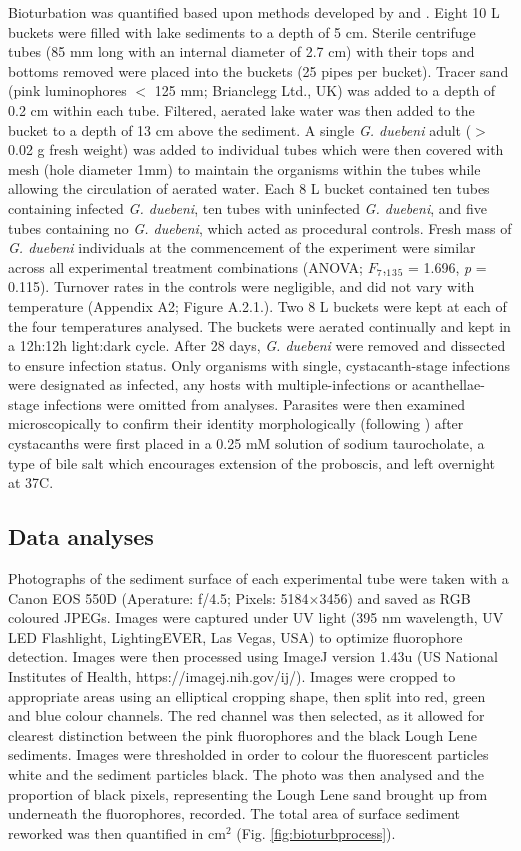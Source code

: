 Bioturbation was quantified based upon methods developed by \citet{denadai2013} and \citet{wohlgemuth2017}. Eight 10 L buckets were filled with lake sediments to a depth of 5 cm. Sterile centrifuge tubes (85 mm long with an internal diameter of 2.7 cm) with their tops and bottoms removed were placed into the buckets (25 pipes per bucket). Tracer sand (pink luminophores $<$ 125 mm; Brianclegg Ltd., UK) was added to a depth of 0.2 cm within each tube. Filtered, aerated lake water was then added to the bucket to a depth of 13 cm above the sediment. A single \emph{G. duebeni} adult ($>$ 0.02 g fresh weight) was added to individual tubes which were then covered with mesh (hole diameter 1mm) to maintain the organisms within the tubes while allowing the circulation of aerated water. Each 8 L bucket contained ten tubes containing infected \emph{G. duebeni}, ten tubes with uninfected \emph{G. duebeni}, and five tubes containing no \emph{G. duebeni}, which acted as procedural controls. Fresh mass of \emph{G. duebeni} individuals at the commencement of the experiment were similar across all experimental treatment combinations (ANOVA; $F_7$,$_1$$_3$$_5$ = 1.696,  \emph{p} = 0.115). Turnover rates in the controls were negligible, and did not vary with temperature (Appendix A2; Figure A.2.1.). Two 8 L buckets were kept at each of the four temperatures analysed. The buckets were aerated continually and kept in a 12h:12h light:dark cycle. After 28 days, \emph{G. duebeni} were removed and dissected to ensure infection status. Only organisms with single, cystacanth-stage infections were designated as infected, any hosts with multiple-infections or acanthellae-stage infections were omitted from analyses. Parasites were then examined microscopically to confirm their identity morphologically (following \citet{mcdonald1988}) after cystacanths were first placed in a 0.25 mM solution of sodium taurocholate, a type of bile salt which encourages extension of the proboscis, and left overnight at 37\degree C.

\subsection{Data analyses}

Photographs of the sediment surface of each experimental tube were taken with a Canon EOS 550D (Aperature: f/4.5; Pixels: 5184$\times$3456) and saved as RGB coloured JPEGs. Images were captured under UV light (395 nm wavelength, UV LED Flashlight, LightingEVER, Las Vegas, USA) to optimize fluorophore detection. Images were then processed using ImageJ version 1.43u (US National Institutes of Health, https://imagej.nih.gov/ij/). Images were cropped to appropriate areas using an elliptical cropping shape, then split into red, green and blue colour channels. The red channel was then selected, as it allowed for clearest distinction between the pink fluorophores and the black Lough Lene sediments.  Images were thresholded in order to colour the fluorescent particles white and the sediment particles black. The photo was then analysed and the proportion of black pixels, representing the Lough Lene sand brought up from underneath the fluorophores, recorded. The total area of surface sediment reworked was then quantified in cm$^2$ (Fig. \ref{fig:bioturbprocess}).

